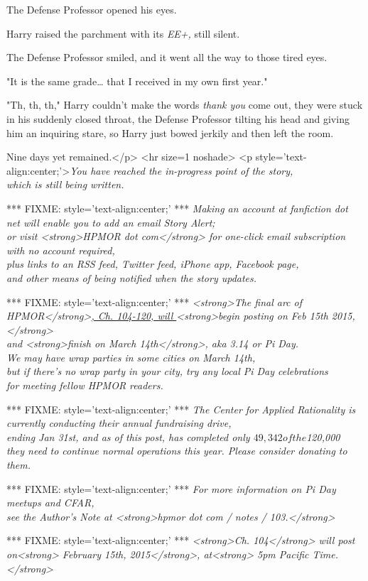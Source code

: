 The Defense Professor opened his eyes.

Harry raised the parchment with its \emph{EE+,} still silent.

The Defense Professor smiled, and it went all the way to those tired eyes.

"It is the same grade{\ldots} that I received in my own first year."

"Th, th, th," Harry couldn't make the words \emph{thank you} come out, they 
were stuck in his suddenly closed throat, the Defense Professor tilting his 
head and giving him an inquiring stare, so Harry just bowed jerkily and then 
left the room.

Nine days yet remained.</p>
<hr size=1 noshade>
<p style='text-align:center;'>\emph{You have reached the in-progress point of 
the story,\\
which is still being written.}

*** FIXME: style='text-align:center;' ***
\emph{Making an account at fanfiction dot net will enable you to add an email 
Story Alert;}\\
\emph{or visit <strong>HPMOR dot com</strong> for one-click email subscription 
with no account required,}\\
\emph{plus links to an RSS feed, Twitter feed, iPhone app, Facebook page,}\\
\emph{and other means of being notified when the story updates.}

*** FIXME: style='text-align:center;' ***
\emph{<strong>The final arc of HPMOR</strong>\underline{, Ch. 104-120, will 
}<strong>begin posting on Feb 15th 2015,</strong>}\\
\emph{and <strong>finish on March 14th</strong>, aka 3.14 or Pi Day.}\\
\emph{We may have wrap parties in some cities on March 14th,}\\
\emph{but if there's no wrap party in your city, try any local Pi Day 
celebrations}\\
\emph{for meeting fellow HPMOR readers.}

*** FIXME: style='text-align:center;' ***
\emph{The Center for Applied Rationality is currently conducting their annual 
fundraising drive,\\
ending Jan 31st, and as of this post, has completed only $49,342 of the 
$120,000\\
they need to continue normal operations this year. Please consider donating to 
them.}

*** FIXME: style='text-align:center;' ***
\emph{For more information on Pi Day meetups and CFAR,}\\
\emph{see the Author's Note at <strong>hpmor dot com / notes / 103.</strong>}

*** FIXME: style='text-align:center;' ***
\emph{<strong>Ch. 104</strong> will post on<strong> February 15th, 
2015</strong>, at<strong> 5pm Pacific Time.</strong>}